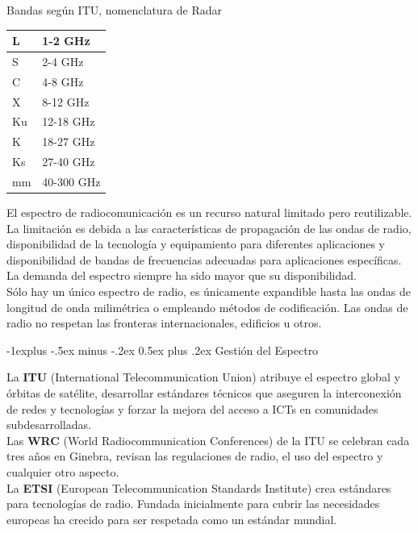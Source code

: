 \documentclass[10pt,portrait, twocolumn]{article}
\makeatletter
\renewcommand{\subsection}{\@startsection{subsection}{2}{0mm}%
                                {-1explus -.5ex minus -.2ex}%
                                {0.5ex plus .2ex}%
                                {\normalfont\normalsize\bfseries}}
\makeatother
\begin{document}
Bandas según ITU, nomenclatura de Radar

	\begin{center}
	\begin{tabular}{|l|l|}
\hline
L  & 1-2 GHz    \\ \hline
S  & 2-4 GHz    \\ \hline
C  & 4-8 GHz    \\ \hline
X  & 8-12 GHz   \\ \hline
Ku & 12-18 GHz  \\ \hline
K  & 18-27 GHz  \\ \hline
Ks & 27-40 GHz  \\ \hline
mm & 40-300 GHz \\ \hline
\end{tabular}
	\end{center}
	
El espectro de radiocomunicación es un recurso natural limitado pero reutilizable. La limitación es debida a las características de propagación de las ondas de radio, disponibilidad de la tecnología y equipamiento para diferentes aplicaciones y disponibilidad de bandas de frecuencias adecuadas para aplicaciones específicas. La demanda del espectro siempre ha sido mayor que su disponibilidad.\\

Sólo hay un único espectro de radio, es únicamente expandible hasta las ondas de longitud de onda milimétrica o empleando métodos de codificación. Las ondas de radio no respetan las fronteras internacionales, edificios u otros.

\subsection{Gestión del Espectro}

La \textbf{ITU} (International Telecommunication Union) atribuye el espectro global y órbitas de satélite, desarrollar estándares técnicos que aseguren la interconexión de redes y tecnologías y forzar la mejora del acceso a ICTs en comunidades subdesarrolladas.\\

Las \textbf{WRC} (World Radiocommunication Conferences) de la ITU se celebran cada tres años en Ginebra, revisan las regulaciones de radio, el uso del espectro y cualquier otro aspecto.\\

La \textbf{ETSI} (European Telecommunication Standards Institute) crea estándares para tecnologías de radio. Fundada inicialmente para cubrir las necesidades europeas ha crecido para ser respetada como un estándar mundial.
\end{document}
